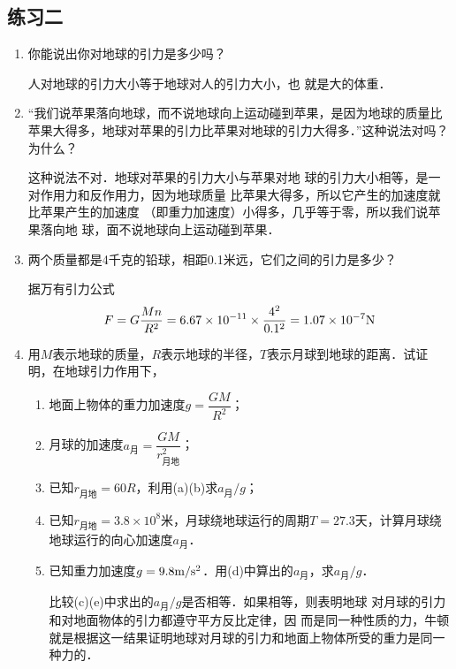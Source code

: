 \subsection{练习二}
\begin{enumerate}
	\item 你能说出你对地球的引力是多少吗？

	\begin{solution}
		人对地球的引力大小等于地球对人的引力大小，也
		就是大的体重．
	\end{solution}
	
\item “我们说苹果落向地球，而不说地球向上运动碰到苹果，是因为地球的质量比苹果大得多，地球对苹果的引力比苹果对地球的引力大得多．”这种说法对吗？为什么？

\begin{solution}
	这种说法不对．地球对苹果的引力大小与苹果对地
	球的引力大小相等，是一对作用力和反作用力，因为地球质量
	比苹果大得多，所以它产生的加速度就比苹果产生的加速度
	（即重力加速度）小得多，几乎等于零，所以我们说苹果落向地
	球，面不说地球向上运动碰到苹果．
\end{solution}

\item 两个质量都是4千克的铅球，相距0.1米远，它们之间的引力是多少？

\begin{solution}
	据万有引力公式
\[F=G\frac{Mn}{R^2}=6.67\times 10^{-11}\times \frac{4^2}{0.1^2}=1.07\times 10^{-7}{\rm N}\]
\end{solution}

\item 用$M$表示地球的质量，$R$表示地球的半径，$T$表示月球到地球的距离．试证明，在地球引力作用下，
\begin{enumerate}
	\item 地面上物体的重力加速度$g=\dfrac{GM}{R^2}$；
	\item 月球的加速度$a_{\text{月}}=\dfrac{GM}{r^2_{\text{月地}}}$；
	\item 已知$r_{\text{月地}}=60R$，利用(a)(b)求$a_{\text{月}}/g$；
	\item 已知$r_{\text{月地}}=3.8\times 10^8$米，月球绕地球运行的周期$T=27.3$天，计算月球绕地球运行的向心加速度$a_{\text{月}}$．
	\item 已知重力加速度$g=9.8\text{m}/\text{s}^2$．用(d)中算出的$a_{\text{月}}$，求$a_{\text{月}}/g$．
	
	比较(c)(e)中求出的$a_{\text{月}}/g$是否相等．如果相等，则表明地球
	对月球的引力和对地面物体的引力都遵守平方反比定律，因
	而是同一种性质的力，牛顿就是根据这一结果证明地球对月球的引力和地面上物体所受的重力是同一种力的．
\end{enumerate}


\end{enumerate}
